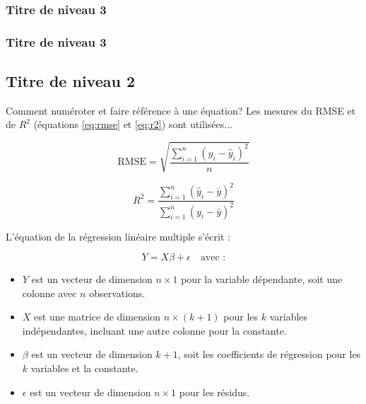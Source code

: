 \lipsum[1] %

\subsubsection{Titre de niveau 3} \label{subsec:metho-4-2-1}

\lipsum[1] %


\subsubsection{Titre de niveau 3} \label{subsec:metho-4-2-2}

\lipsum[1] %

\subsection{Titre de niveau 2}\label{subsec:metho-4-3}

Comment numéroter et faire référence à une équation? Les mesures du RMSE et de $R^2$ (équations \ref{eq:rmse} et \ref{eq:r2}) sont utilisées...


\begin{equation}
\text{RMSE} = \sqrt{\frac{\sum_{i=1}^{n}\left(y_i - \hat{y}_i\right)^2}{n}} 
\label{eq:rmse}
\end{equation}

\begin{equation}
R^2 = \frac{\sum_{i=1}^{n}\left(\hat{y}_i - \bar{y}\right)^2}{\sum_{i=1}^{n}\left(y_i - \bar{y}\right)^2} 
\label{eq:r2}
\end{equation}

L'équation de la régression linéaire multiple s'écrit :

\begin{equation}
Y = X\beta + \epsilon \quad \text{avec :}
\label{eq:regression_lineaire}
\end{equation}
\begin{itemize}
    \item $Y$ est un vecteur de dimension $n \times 1$ pour la variable dépendante, soit une colonne avec $n$ observations.
    \item $X$ est une matrice de dimension $n \times (k+1)$ pour les $k$ variables indépendantes, incluant une autre colonne pour la constante.
    \item $\beta$ est un vecteur de dimension $k+1$, soit les coefficients de régression pour les $k$ variables et la constante.
    \item $\epsilon$ est un vecteur de dimension $n \times 1$ pour les résidus.
\end{itemize} 

